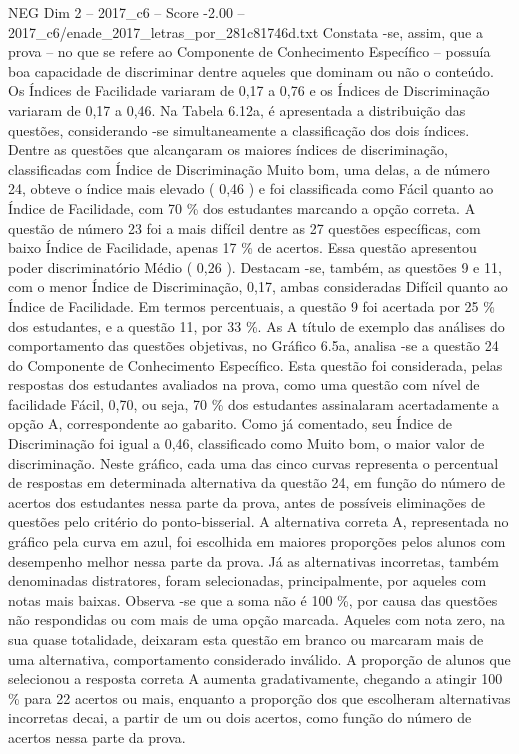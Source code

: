 \begin{textsample}{NEG Dim 2 – 2017\_c6 – Score -2.00 – 2017\_c6/enade\_2017\_letras\_por\_281c81746d.txt}
Constata -se, assim, que a prova – no que se refere ao Componente de Conhecimento Específico – possuía boa capacidade de discriminar dentre aqueles que dominam ou não o conteúdo.
Os Índices de Facilidade variaram de 0,17 a 0,76 e os Índices de Discriminação variaram de 0,17 a 0,46.
Na Tabela 6.12a, é apresentada a distribuição das questões, considerando -se simultaneamente a classificação dos dois índices.
Dentre as questões que alcançaram os maiores índices de discriminação, classificadas com Índice de Discriminação Muito bom, uma delas, a de número 24, obteve o índice mais elevado ( 0,46 ) e foi classificada como Fácil quanto ao Índice de Facilidade, com 70 \% dos estudantes marcando a opção correta.
A questão de número 23 foi a mais difícil dentre as 27 questões específicas, com baixo Índice de Facilidade, apenas 17 \% de acertos.
Essa questão apresentou poder discriminatório Médio ( 0,26 ).
Destacam -se, também, as questões 9 e 11, com o menor Índice de Discriminação, 0,17, ambas consideradas Difícil quanto ao Índice de Facilidade.
Em termos percentuais, a questão 9 foi acertada por 25 \% dos estudantes, e a questão 11, por 33 \%.
As A título de exemplo das análises do comportamento das questões objetivas, no Gráfico 6.5a, analisa -se a questão 24 do Componente de Conhecimento Específico.
Esta questão foi considerada, pelas respostas dos estudantes avaliados na prova, como uma questão com nível de facilidade Fácil, 0,70, ou seja, 70 \% dos estudantes assinalaram acertadamente a opção A, correspondente ao gabarito.
Como já comentado, seu Índice de Discriminação foi igual a 0,46, classificado como Muito bom, o maior valor de discriminação.
Neste gráfico, cada uma das cinco curvas representa o percentual de respostas em determinada alternativa da questão 24, em função do número de acertos dos estudantes nessa parte da prova, antes de possíveis eliminações de questões pelo critério do ponto-bisserial.
A alternativa correta A, representada no gráfico pela curva em azul, foi escolhida em maiores proporções pelos alunos com desempenho melhor nessa parte da prova.
Já as alternativas incorretas, também denominadas distratores, foram selecionadas, principalmente, por aqueles com notas mais baixas.
Observa -se que a soma não é 100 \%, por causa das questões não respondidas ou com mais de uma opção marcada.
Aqueles com nota zero, na sua quase totalidade, deixaram esta questão em branco ou marcaram mais de uma alternativa, comportamento considerado inválido.
A proporção de alunos que selecionou a resposta correta A aumenta gradativamente, chegando a atingir 100 \% para 22 acertos ou mais, enquanto a proporção dos que escolheram alternativas incorretas decai, a partir de um ou dois acertos, como função do número de acertos nessa parte da prova.

\end{textsample}
